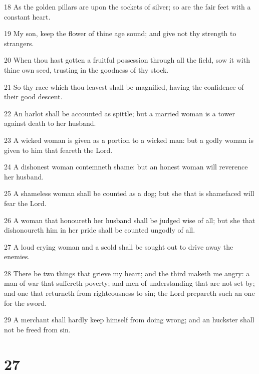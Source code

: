 \par 18 As the golden pillars are upon the sockets of silver; so are the fair feet with a constant heart.
\par 19 My son, keep the flower of thine age sound; and give not thy strength to strangers.
\par 20 When thou hast gotten a fruitful possession through all the field, sow it with thine own seed, trusting in the goodness of thy stock.
\par 21 So thy race which thou leavest shall be magnified, having the confidence of their good descent.
\par 22 An harlot shall be accounted as spittle; but a married woman is a tower against death to her husband.
\par 23 A wicked woman is given as a portion to a wicked man: but a godly woman is given to him that feareth the Lord.
\par 24 A dishonest woman contemneth shame: but an honest woman will reverence her husband.
\par 25 A shameless woman shall be counted as a dog; but she that is shamefaced will fear the Lord.
\par 26 A woman that honoureth her husband shall be judged wise of all; but she that dishonoureth him in her pride shall be counted ungodly of all.
\par 27 A loud crying woman and a scold shall be sought out to drive away the enemies.
\par 28 There be two things that grieve my heart; and the third maketh me angry: a man of war that suffereth poverty; and men of understanding that are not set by; and one that returneth from righteousness to sin; the Lord prepareth such an one for the sword.
\par 29 A merchant shall hardly keep himself from doing wrong; and an huckster shall not be freed from sin.

\chapter{27}


